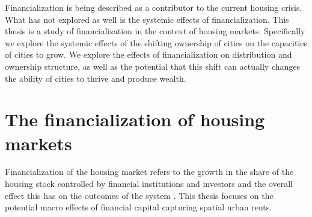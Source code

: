 Financialization is being described  %
as a contributor to the current housing crisis. What has not explored as well is the systemic effects of financialization. 
 This thesis is a study of financialization in the context of housing markets. Specifically we explore the systemic effects of the shifting ownership of cities on the capacities of cities to grow. We explore the effects of financialization on distribution and ownership structure, as well as the potential that this shift can actually changes %
 the ability of cities to thrive and produce wealth. 
 
 

\section{The financialization of housing markets}
Financialization of the housing market refers to the growth in the share of the housing stock controlled by financial institutions and investors and the overall effect this has on the outcomes of the system \cite{farhaReportFinancializationHousing2017, hansenFinanceCapitalismFinancialization2014}. 
This thesis focuses on the potential macro effects of financial capital capturing spatial urban rents. 


